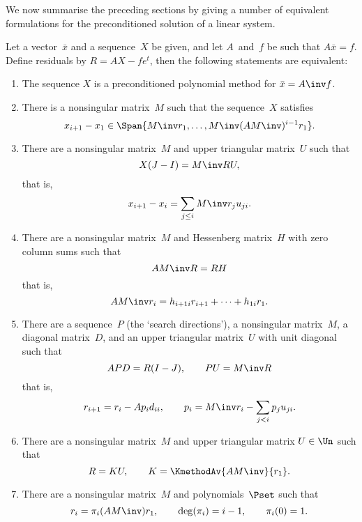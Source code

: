We now summarise the preceding sections by giving a number of
equivalent formulations for the preconditioned solution of a linear
system.

\begin{theorem}
\label{main-theorem}
Let a vector~$\bar x$ and a sequence~$X$ be given,
and let $A$~and~$f$ be such that $A\bar x=f$. Define residuals by
$R=AX-fe^t$, then the following statements are equivalent:
\begin{enumerate}
\item The sequence $X$ is a preconditioned polynomial method for
$\bar x=\nobreak A\inv f$.
%
\item\label{x=span(MAMr)}
There is a nonsingular matrix~$M$ such that the sequence~$X$ satisfies
        \begin{equation} x_{i+1}-x_1\in\Span
                {M\inv  r_1,\ldots,M\inv  (AM\inv )^{i-1} r_1}.
                \label{eq:x-in-Mr}\end{equation}
%
\item\label{X(J-I)=MRU}
There are a nonsingular matrix~$M$ and upper
triangular matrix~$U$ such that
        \[ X(J-I)=M\inv RU, \]
that is,
\begin{equation}
                x_{i+1}-x_i=\sum_{j\leq i}M\inv r_ju_{ji}.
                \label{sol:recurrence}\end{equation}
%
\item\label{AMR=RH}
There are a nonsingular matrix~$M$ and Hessenberg matrix~$H$
with zero column sums such that
        \[ AM\inv R=RH \]
that is,
\begin{equation}
                AM\inv r_i=h_{i+1i}r_{i+1}+\cdots+h_{1i}r_1.
                \label{res:direct-recurrence}\end{equation}
%
\item\label{APD=R(I-J)}
There are a sequence~$P$ (the `search directions'), a
nonsingular matrix~$M$, a diagonal matrix~$D$, and an upper
triangular matrix~$U$ with unit diagonal such that
        \[ APD=R(I-J),\qquad PU=M\inv R \]
that is,
\begin{equation}
                r_{i+1}=r_i-Ap_id_{ii},
                \qquad
                p_i=M\inv r_i-\sum_{j<i}p_ju_{ji}.
                \label{res,p:recurrence}\end{equation}
%
\item\label{R=KU}
There are a nonsingular matrix~$M$ and upper triangular
matrix $U\in \Un$ such that
\[ R=KU,\qquad K=\KmethodAv{AM\inv}{r_1}. \]
\item\label{R=pi(AMinv)}
There are a nonsingular matrix~$M$ and polynomials~$\Pset$
such that
        \[ r_i=\pi_i(AM\inv )r_1,\qquad
                {\rm deg}(\pi_i)=i-1,\qquad
                \pi_i(0)=1. \]
\end{enumerate}
\end{theorem}
